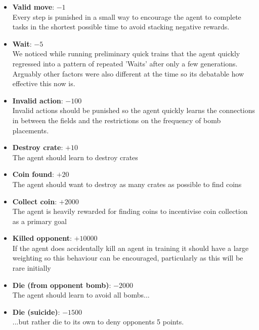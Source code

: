 \begin{itemize}
	\item \textbf{Valid move}: $-1$ \\Every step is punished in a small way to encourage the agent to complete tasks in the shortest possible time to avoid stacking negative rewards.
	\item \textbf{Wait}: $-5$\\We noticed while running preliminary quick trains that the agent quickly regressed into a pattern of repeated 'Waits' after only a few generations. Arguably other factors were also different at the time so its debatable how effective this now is.
	\item \textbf{Invalid action}: $-100$\\Invalid actions should be punished so the agent quickly learns the connections in between the fields and the restrictions on the frequency of bomb placements.
	\item \textbf{Destroy crate}: $+10$\\The agent should learn to destroy crates
	\item \textbf{Coin found}: $+20$\\The agent should want to destroy as many crates as possible to find coins
	\item \textbf{Collect coin}: $+2000$\\The agent is heavily rewarded for finding coins to incentivise coin collection as a primary goal 
	\item \textbf{Killed opponent}: $+10000$\\If the agent does accidentally kill an agent in training it should have a large weighting so this behaviour can be encouraged, particularly as this will be rare initially
	\item \textbf{Die (from opponent bomb)}: $-2000$\\The agent should learn to avoid all bombs...
	\item \textbf{Die (suicide)}: $-1500$\\...but rather die to its own to deny opponents 5 points.
\end{itemize}	
	
